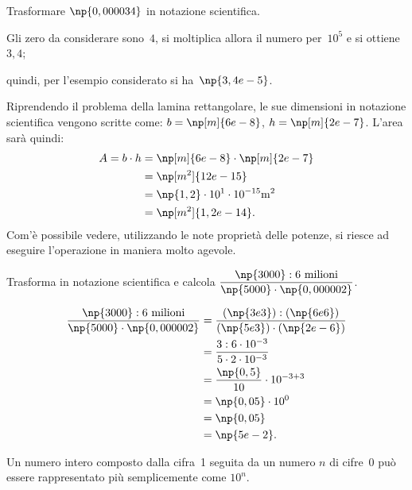 \begin{exrig}
 \begin{esempio}
Trasformare $\np{0,000034}$ in notazione scientifica.
\begin{enumeratea}
\item Gli zero da considerare sono~$4$, si moltiplica allora il numero per~$10^5$ e si
ottiene~$3,4$;
\item quindi, per l'esempio considerato si ha~$\np{3,4e-5}$.
\end{enumeratea}
 \end{esempio}

\begin{esempio}
Riprendendo il problema della lamina rettangolare, le sue dimensioni in notazione scientifica vengono scritte come:
$b=\np[m]{6e-8}$, $h=\np[m]{2e-7}$.
L'area sarà quindi:
\begin{align*}
A =b\cdot h &=\np[m]{6e-8} \cdot \np[m]{2e-7}\\
 &=\np[m^2]{12e-15}\\
 &=\np{1,2}\cdot 10^1\cdot 10^{-15}\unit{m^2}\\
 &=\np[m^2]{1,2e-14}.
\end{align*}
Com'è possibile vedere, utilizzando le note proprietà delle potenze, si riesce ad eseguire l'operazione
in maniera molto agevole.
\end{esempio}

\begin{esempio}
Trasforma in notazione scientifica e calcola
$\displaystyle{\frac{\np{3000}:6\text{ milioni}}{\np{5000}\cdot\np{0,000002}}}$.

\begin{align*}
\frac{\np{3000}:6\text{ milioni}}{\np{5000}\cdot\np{0,000002}}&=\frac{(\np{3e3}):(\np{6e6})}{(\np{5e3})\cdot(\np{2e-6})}\\
 &=\frac{3:6\cdot10^{-3}}{5\cdot 2\cdot 10^{-3}}\\
 &=\frac{\np{0,5}}{10}\cdot10^{-3+3}\\
 &=\np{0,05}\cdot10^0\\
 &=\np{0,05}\\
 &=\np{5e-2}.
\end{align*}
\end{esempio}
\end{exrig}

\osservazione Un numero intero composto dalla cifra~1 seguita da un numero $n$ di cifre~0 può essere rappresentato più semplicemente come $10^n$.

